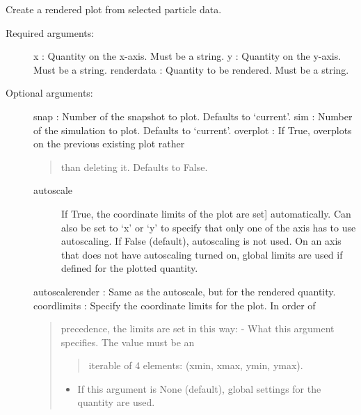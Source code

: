 \documentclass[letterpaper,10pt,english]{sphinxmanual}
\begin{document}
\begin{fulllineitems}
\label{index:facade.render}
Create a rendered plot from selected particle data.
\begin{description}
\item[{Required arguments:}] \leavevmode
x          : Quantity on the x-axis. Must be a string.
y          : Quantity on the y-axis. Must be a string.
renderdata : Quantity to be rendered. Must be a string.

\item[{Optional arguments:}] \leavevmode
snap       : Number of the snapshot to plot. Defaults to `current'.
sim        : Number of the simulation to plot. Defaults to `current'.
overplot   : If True, overplots on the previous existing plot rather
\begin{quote}

than deleting it. Defaults to False.
\end{quote}
\begin{description}
\item[{autoscale}] \leavevmode{[}If True, the coordinate limits of the plot are set{]}
automatically.  Can also be set to `x' or `y' to specify
that only one of the axis has to use autoscaling.
If False (default), autoscaling is not used. On an axis that
does not have autoscaling turned on, global limits are used
if defined for the plotted quantity.

\end{description}

autoscalerender : Same as the autoscale, but for the rendered quantity.
coordlimits : Specify the coordinate limits for the plot. In order of
\begin{quote}

precedence, the limits are set in this way:
- What this argument specifies. The value must be an
\begin{quote}

iterable of 4 elements: (xmin, xmax, ymin, ymax).
\end{quote}
\begin{itemize}
\item {} 
If this argument is None (default), global settings for
the quantity are used.


\end{itemize}
\end{quote}
\end{description}
\end{fulllineitems}
\end{document}
